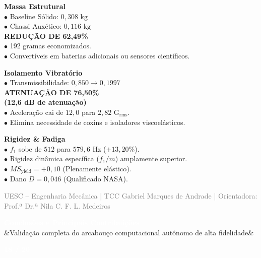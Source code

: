 \documentclass[11pt]{article}
\newcommand{\slideheader}[3]{
    \noindent
    \begin{minipage}{\textwidth}
        \colorbox{SpaceNavy}{
            \parbox{\dimexpr\textwidth-2\fboxsep\relax}{
                \vspace{0.2cm}
                \hspace{0.3cm}
                \begin{minipage}{0.85\textwidth}
                    {\Large \textbf{\textcolor{white}{#1}}}\\[0.1cm]
                    \ifx&#2&\else{\small \textbf{\textcolor{SpaceGold}{#2}}}\fi
                \end{minipage}
                \hfill
                \begin{minipage}{0.10\textwidth}
                    \raggedleft
                    {\large \textbf{\textcolor{white}{#3 / 20}}}\hspace{0.3cm}
                \end{minipage}
                \vspace{0.2cm}
            }
        }
    \end{minipage}
    \vspace{0.4cm}
}
\newcommand{\slidefooter}{
    \vfill
    \noindent
    \begin{minipage}{\textwidth}
        \centering
        \scriptsize \textcolor{gray}{UESC -- Engenharia Mecânica | TCC Gabriel Marques de Andrade | Orientadora: Prof.ª Dr.ª Nila C. F. L. Medeiros}
    \end{minipage}
}
\begin{document}
\begin{minipage}[t]{0.31\textwidth}
    \textbf{\textcolor{NavyAccent}{Massa Estrutural}}\\[0.2cm]
    \small
    $\bullet$ Baseline Sólido: $0{,}308\text{ kg}$\\
    $\bullet$ Chassi Auxético: $0{,}116\text{ kg}$\\[0.2cm]
    \textbf{\textcolor{ApprovedGreen}{REDUÇÃO DE 62,49\%}}\\[0.2cm]
    $\bullet$ 192 gramas economizados.\\
    $\bullet$ Convertíveis em baterias adicionais ou sensores científicos.
\end{minipage}
\hfill
\begin{minipage}[t]{0.31\textwidth}
    \textbf{\textcolor{NavyAccent}{Isolamento Vibratório}}\\[0.2cm]
    \small
    $\bullet$ Transmissibilidade: $0{,}850 \to 0{,}1997$\\[0.2cm]
    \textbf{\textcolor{ApprovedGreen}{ATENUAÇÃO DE 76,50\%}}\\
    \textbf{\textcolor{ApprovedGreen}{(12,6 dB de atenuação)}}\\[0.2cm]
    $\bullet$ Aceleração cai de $12{,}0$ para $2{,}82\text{ G}_{\text{rms}}$.\\
    $\bullet$ Elimina necessidade de coxins e isoladores viscoelásticos.
\end{minipage}
\hfill
\begin{minipage}[t]{0.31\textwidth}
    \textbf{\textcolor{NavyAccent}{Rigidez \& Fadiga}}\\[0.2cm]
    \small
    $\bullet$ $f_1$ sobe de $512$ para $579{,}6\text{ Hz}$ ($+13{,}20\%$).\\
    $\bullet$ Rigidez dinâmica específica ($f_1/m$) amplamente superior.\\
    $\bullet$ $MS_{\text{yield}} = +0{,}10$ (Plenamente elástico).\\
    $\bullet$ Dano $D = 0{,}046$ (Qualificado NASA).
\end{minipage}

\slidefooter
\clearpage

\slideheader{Conclusões e Principais Contribuições}{Validação completa do arcabouço computacional autônomo de alta fidelidade}{18}
\end{document}
